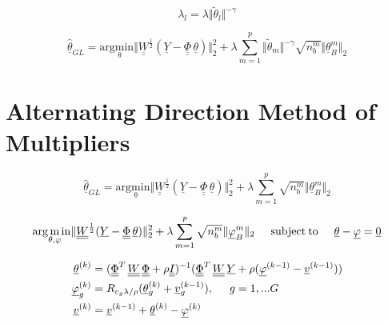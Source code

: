  \begin{equation}
	\lambda_l = \lambda \Vert \tilde{\theta}_l \Vert^{-\gamma}
	\label{eq:lambda_parameter}
\end{equation}


 \begin{equation}
	\hat{\underline{\theta}}_{GL} = \mathrm{arg \underset{\theta} min} \Vert \underline{\underline{W}}^{\frac{1}{2}} (\underline{Y}-\underline{\underline{\Phi}} \, \underline{\theta}) \Vert^2_2 + \lambda \sum_{m=1}^p \Vert \tilde{\theta}_m \Vert^{-\gamma} \sqrt{n^m_b} \Vert \underline{\theta}^m_B \Vert_2
	\label{eq:adaptive_grouplasso_2}
\end{equation}


\section{Alternating Direction Method of Multipliers}
\label{sec:ADMM}




 \begin{equation}
	\hat{\underline{\theta}}_{GL} = \mathrm{arg \underset{\theta} min} \Vert \underline{\underline{W}}^{\frac{1}{2}} (\underline{Y}-\underline{\underline{\Phi}} \, \underline{\theta}) \Vert^2_2 + \lambda \sum_{m=1}^p \sqrt{n^m_b} \Vert \underline{\theta}^m_B \Vert_2
	\label{eq:admm_gl}
\end{equation}


 \begin{equation}
	\mathrm{arg \underset{\theta, \varphi} min} \Vert \underline{\underline{W}}^{\frac{1}{2}} (\underline{Y}-\underline{\underline{\Phi}} \, \underline{\theta}) \Vert^2_2 + \lambda \sum_{m=1}^p \sqrt{n^m_b} \Vert \underline{\varphi}^m_B \Vert_2 \hspace{0.5cm} \mathrm{subject \: to} \hspace{0.5cm} \underline{\theta} - \underline{\varphi} = \underline{0}
	\label{eq:admm_extended}
\end{equation}




\begin{align}
	\underline{\theta}^{(k)} &= (\underline{\underline{\Phi}}^T \, \underline{\underline{W}} \, \underline{\underline{\Phi}} + \rho \underline{\underline{I}})^{-1}(\underline{\underline{\Phi}}^T \, \underline{\underline{W}} \, \underline{Y} + \rho (\underline{\varphi}^{(k-1)}-\underline{v}^{(k-1)})) \label{eq:eq1} \\ 
	\underline{\varphi}^{(k)}_g &= R_{c_g \lambda/ \rho}(\underline{\theta}_g^{(k)}+\underline{v}_g^{(k-1)}), \hspace{0.5cm} g= 1,...G  \label{eq:eq2} \\ 
	\underline{v}^{(k)} &= \underline{v}^{(k-1)}+ \underline{\theta}^{(k)}-\underline{\varphi}^{(k)}
	\label{eq:eq3}
\end{align}


